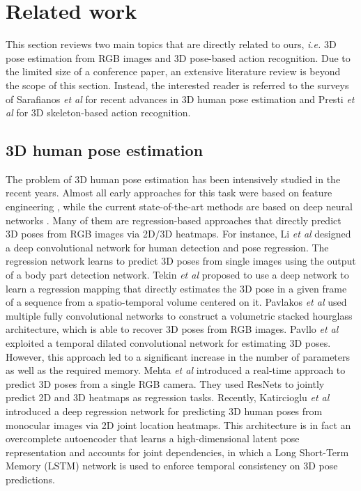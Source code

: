 \documentclass{bmvc2k}
\def\etal{\emph{et al}\bmvaOneDot}
\begin{document}
\section{Related work \\[-0.2cm]} \label{sect:2}
This section reviews two main topics that are directly related to ours, \textit{i.e.} 3D pose estimation from RGB images and 3D pose-based action recognition. Due to the limited size of a conference paper, an extensive literature review is beyond the scope of this section. Instead, the interested reader is referred to the surveys of Sarafianos \etal \cite{Sarafianos20163DHP} for recent advances in 3D human pose estimation and Presti \etal \cite{presti20163d} for 3D skeleton-based action recognition.\\[-0.8cm]
\subsection{3D human pose estimation \\[-0.1cm]}
The problem of 3D human pose estimation has been intensively studied in the recent years. Almost all early approaches for this task were based on feature engineering \cite{4020735,10.1007/978-3-642-33765-9_41,6682899}, while the current state-of-the-art methods are based on deep neural networks \cite{li20143d,tekin2016direct,pavlakos2017coarse,pavllo20183d,VNect_SIGGRAPH2017,Katircioglu2018}. Many of them are regression-based approaches that directly predict 3D poses from RGB images via 2D/3D heatmaps. For instance, Li \etal \cite{li20143d} designed a deep convolutional network for human detection and pose regression. The regression network learns to predict 3D poses from single images using the output of a body
part detection network. Tekin \etal \cite{tekin2016direct} proposed to use a deep network to learn a regression mapping that directly estimates the 3D pose in a given frame of a sequence from a spatio-temporal volume centered on it. Pavlakos \etal \cite{pavlakos2017coarse} used multiple fully convolutional networks to construct a volumetric stacked hourglass architecture, which is able to recover 3D poses from RGB images. Pavllo \etal \cite{pavllo20183d} exploited a temporal dilated convolutional network \cite{Yu2016MultiScaleCA} for estimating 3D poses. However, this approach led to a significant increase in the number of parameters as well as the required memory. Mehta \etal \cite{VNect_SIGGRAPH2017} introduced a real-time approach to predict 3D poses from a single RGB camera. They used ResNets \cite{7780459} to jointly predict 2D and 3D heatmaps as regression tasks. Recently, Katircioglu \etal \cite{Katircioglu2018} introduced a deep regression network for predicting 3D human poses from monocular images via 2D joint location heatmaps. This architecture is in fact an overcomplete autoencoder that learns a high-dimensional latent pose representation and accounts for joint dependencies, in which a Long Short-Term Memory (LSTM) network \cite{Hochreiter1997LongSM} is used to enforce temporal consistency on 3D pose predictions.
\end{document}
